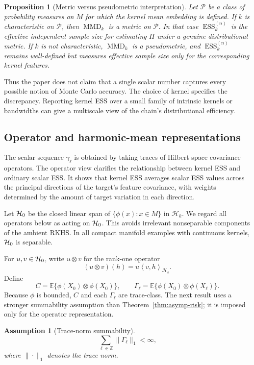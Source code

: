 \documentclass[11pt]{article}
\newtheorem{proposition}[theorem]{Proposition}
\newtheorem{assumption}{Assumption}
\newcommand{\E}{\mathbb{E}}
\newcommand{\1}{\mathbf{1}}
\newcommand{\inner}[2]{\left\langle #1, #2 \right\rangle}
\newcommand{\MMD}{\operatorname{MMD}}
\newcommand{\ESS}{\operatorname{ESS}}
\newcommand{\Hk}{\mathcal{H}_k}
\begin{document}
\begin{proposition}[Metric versus pseudometric interpretation]
\label{prop:characteristic}
Let $\mathcal P$ be a class of probability measures on $M$ for which the kernel mean embedding is defined. If $k$ is characteristic on $\mathcal P$, then $\MMD_k$ is a metric on $\mathcal P$. In that case $\ESS_k^{(n)}$ is the effective independent sample size for estimating $\Pi$ under a genuine distributional metric. If $k$ is not characteristic, $\MMD_k$ is a pseudometric, and $\ESS_k^{(n)}$ remains well-defined but measures effective sample size only for the corresponding kernel features.
\end{proposition}

Thus the paper does not claim that a single scalar number captures every possible notion of Monte Carlo accuracy. The choice of kernel specifies the discrepancy. Reporting kernel ESS over a small family of intrinsic kernels or bandwidths can give a multiscale view of the chain's distributional efficiency.

\subsection{Operator and harmonic-mean representations}

The scalar sequence $\gamma_\ell$ is obtained by taking traces of Hilbert-space covariance operators. The operator view clarifies the relationship between kernel ESS and ordinary scalar ESS. It shows that kernel ESS averages scalar ESS values across the principal directions of the target's feature covariance, with weights determined by the amount of target variation in each direction.

Let $\mathcal{H}_0$ be the closed linear span of $\{\phi(x):x\in M\}$ in $\Hk$. We regard all operators below as acting on $\mathcal{H}_0$. This avoids irrelevant nonseparable components of the ambient RKHS. In all compact manifold examples with continuous kernels, $\mathcal{H}_0$ is separable.

For $u,v\in\mathcal{H}_0$, write $u\otimes v$ for the rank-one operator
\[
(u\otimes v)(h)=u\inner{v}{h}_{\Hk}.
\]
Define
\[
C=\E\{\phi(X_0)\otimes\phi(X_0)\},\qquad
\Gamma_\ell=\E\{\phi(X_0)\otimes\phi(X_\ell)\}.
\]
Because $\phi$ is bounded, $C$ and each $\Gamma_\ell$ are trace-class. The next result uses a stronger summability assumption than Theorem~\ref{thm:asymp-risk}; it is imposed only for the operator representation.

\begin{assumption}[Trace-norm summability]
\label{ass:trace-sum}
\[
\sum_{\ell\in\mathbb Z}\|\Gamma_\ell\|_1<\infty,
\]
where $\|\cdot\|_1$ denotes the trace norm.
\end{assumption}
\end{document}
